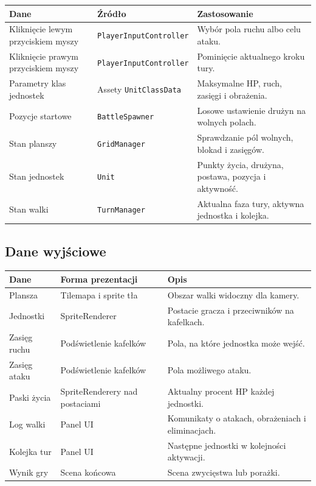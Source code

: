 \documentclass[12pt,a4paper]{article}
\begin{document}
\begin{longtable}{p{4cm} p{5cm} p{5cm}}
\toprule
\textbf{Dane} & \textbf{Źródło} & \textbf{Zastosowanie} \\
\midrule
\endhead
Kliknięcie lewym przyciskiem myszy & \texttt{PlayerInputController} & Wybór pola ruchu albo celu ataku. \\[4pt]
Kliknięcie prawym przyciskiem myszy & \texttt{PlayerInputController} & Pominięcie aktualnego kroku tury. \\[4pt]
Parametry klas jednostek & Assety \texttt{UnitClassData} & Maksymalne HP, ruch, zasięgi i obrażenia. \\[4pt]
Pozycje startowe & \texttt{BattleSpawner} & Losowe ustawienie drużyn na wolnych polach. \\[4pt]
Stan planszy & \texttt{GridManager} & Sprawdzanie pól wolnych, blokad i zasięgów. \\[4pt]
Stan jednostek & \texttt{Unit} & Punkty życia, drużyna, postawa, pozycja i aktywność. \\[4pt]
Stan walki & \texttt{TurnManager} & Aktualna faza tury, aktywna jednostka i kolejka. \\
\bottomrule
\end{longtable}

\subsection{Dane wyjściowe}

\begin{longtable}{p{4cm} p{5cm} p{5cm}}
\toprule
\textbf{Dane} & \textbf{Forma prezentacji} & \textbf{Opis} \\
\midrule
\endhead
Plansza & Tilemapa i sprite tła & Obszar walki widoczny dla kamery. \\[4pt]
Jednostki & SpriteRenderer & Postacie gracza i przeciwników na kafelkach. \\[4pt]
Zasięg ruchu & Podświetlenie kafelków & Pola, na które jednostka może wejść. \\[4pt]
Zasięg ataku & Podświetlenie kafelków & Pola możliwego ataku. \\[4pt]
Paski życia & SpriteRenderery nad postaciami & Aktualny procent HP każdej jednostki. \\[4pt]
Log walki & Panel UI & Komunikaty o atakach, obrażeniach i eliminacjach. \\[4pt]
Kolejka tur & Panel UI & Następne jednostki w kolejności aktywacji. \\[4pt]
Wynik gry & Scena końcowa & Scena zwycięstwa lub porażki. \\
\bottomrule
\end{longtable}
\end{document}
